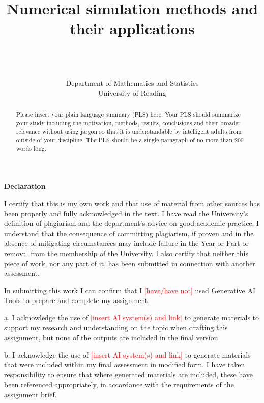 \documentclass[11pt,a4paper]{article}
\title{Numerical simulation methods and their applications}
\author{\StudentName\\ \StudentNumber \\ \phantom{} \\ Department of Mathematics and Statistics \\ University of Reading }
\date{} %
\begin{document}
\maketitle



\begin{abstract}
Please insert your plain language summary (PLS) here. Your PLS should summarize your study including the motivation, methods, results, conclusions and their broader relevance without using jargon so that it is understandable by intelligent adults from outside of your discipline. The PLS should be a single paragraph of no more than 200 words long.

\end{abstract}



\newpage
\Large\textbf{Declaration}
\normalsize

I certify that this is my own work and that use of material from other sources has been properly and fully acknowledged in the text. I have read the University’s definition of plagiarism and the department’s advice on good academic practice. I understand that the consequence of committing plagiarism, if proven and in the absence of mitigating circumstances may include failure in the Year or Part or removal from the membership of the University. I also certify that neither this piece of work, nor any part of it, has been submitted in connection with another assessment.

In submitting this work I can confirm that I \textcolor{red}{[have/have not]} used Generative AI Tools to prepare and complete my assignment.  


a. I acknowledge the use of \textcolor{red}{[insert AI system(s) and link]} to generate materials to support my research and understanding on the topic when drafting this assignment, but none of the outputs are included in the final version. 

b. I acknowledge the use of \textcolor{red}{[insert AI system(s) and link]} to generate materials that were included within my final assessment in modified form. I have taken responsibility to ensure that where generated materials are included, these have been referenced appropriately, in accordance with the requirements of the assignment brief. 
\end{document}
